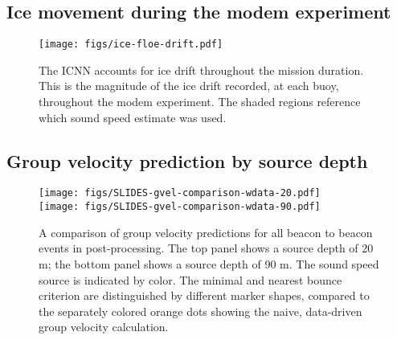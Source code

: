 \subsection*{Ice movement during the modem experiment}
\begin{figure}[h!]
\texttt{[image: figs/ice-floe-drift.pdf]}
\caption{\label{fig:iceFloeDrift}{The ICNN accounts for ice drift throughout the mission duration. This is the magnitude of the ice drift recorded, at each buoy, throughout the modem experiment. The shaded regions reference which sound speed estimate was used.}}
\end{figure}

\clearpage
\FloatBarrier
\subsection*{Group velocity prediction by source depth}
\begin{figure}[h!]
\texttt{[image: figs/SLIDES-gvel-comparison-wdata-20.pdf]} \\
\vspace{2em}
\texttt{[image: figs/SLIDES-gvel-comparison-wdata-90.pdf]}
\caption{A comparison of group velocity predictions for all beacon to beacon events in post-processing. The top panel shows a source depth of 20 m; the bottom panel shows a source depth of 90 m. The sound speed source is indicated by color. The minimal and nearest bounce criterion are distinguished by different marker shapes, compared to the separately colored orange dots showing the naive, data-driven group velocity calculation.}
\end{figure}









